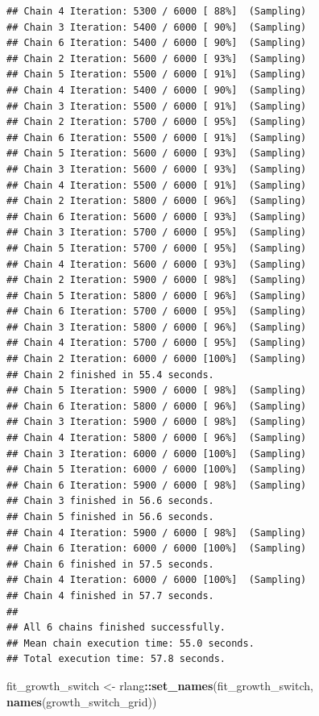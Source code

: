 \documentclass[
]{article}
\newenvironment{Shaded}{\begin{snugshade}}{\end{snugshade}}
\newcommand{\FunctionTok}[1]{\textcolor[rgb]{0.13,0.29,0.53}{\textbf{#1}}}
\newcommand{\NormalTok}[1]{#1}
\newcommand{\OtherTok}[1]{\textcolor[rgb]{0.56,0.35,0.01}{#1}}
\newcommand{\SpecialCharTok}[1]{\textcolor[rgb]{0.81,0.36,0.00}{\textbf{#1}}}
\begin{document}
\begin{verbatim}
## Chain 4 Iteration: 5300 / 6000 [ 88%]  (Sampling) 
## Chain 3 Iteration: 5400 / 6000 [ 90%]  (Sampling) 
## Chain 6 Iteration: 5400 / 6000 [ 90%]  (Sampling) 
## Chain 2 Iteration: 5600 / 6000 [ 93%]  (Sampling) 
## Chain 5 Iteration: 5500 / 6000 [ 91%]  (Sampling) 
## Chain 4 Iteration: 5400 / 6000 [ 90%]  (Sampling) 
## Chain 3 Iteration: 5500 / 6000 [ 91%]  (Sampling) 
## Chain 2 Iteration: 5700 / 6000 [ 95%]  (Sampling) 
## Chain 6 Iteration: 5500 / 6000 [ 91%]  (Sampling) 
## Chain 5 Iteration: 5600 / 6000 [ 93%]  (Sampling) 
## Chain 3 Iteration: 5600 / 6000 [ 93%]  (Sampling) 
## Chain 4 Iteration: 5500 / 6000 [ 91%]  (Sampling) 
## Chain 2 Iteration: 5800 / 6000 [ 96%]  (Sampling) 
## Chain 6 Iteration: 5600 / 6000 [ 93%]  (Sampling) 
## Chain 3 Iteration: 5700 / 6000 [ 95%]  (Sampling) 
## Chain 5 Iteration: 5700 / 6000 [ 95%]  (Sampling) 
## Chain 4 Iteration: 5600 / 6000 [ 93%]  (Sampling) 
## Chain 2 Iteration: 5900 / 6000 [ 98%]  (Sampling) 
## Chain 5 Iteration: 5800 / 6000 [ 96%]  (Sampling) 
## Chain 6 Iteration: 5700 / 6000 [ 95%]  (Sampling) 
## Chain 3 Iteration: 5800 / 6000 [ 96%]  (Sampling) 
## Chain 4 Iteration: 5700 / 6000 [ 95%]  (Sampling) 
## Chain 2 Iteration: 6000 / 6000 [100%]  (Sampling) 
## Chain 2 finished in 55.4 seconds.
## Chain 5 Iteration: 5900 / 6000 [ 98%]  (Sampling) 
## Chain 6 Iteration: 5800 / 6000 [ 96%]  (Sampling) 
## Chain 3 Iteration: 5900 / 6000 [ 98%]  (Sampling) 
## Chain 4 Iteration: 5800 / 6000 [ 96%]  (Sampling) 
## Chain 3 Iteration: 6000 / 6000 [100%]  (Sampling) 
## Chain 5 Iteration: 6000 / 6000 [100%]  (Sampling) 
## Chain 6 Iteration: 5900 / 6000 [ 98%]  (Sampling) 
## Chain 3 finished in 56.6 seconds.
## Chain 5 finished in 56.6 seconds.
## Chain 4 Iteration: 5900 / 6000 [ 98%]  (Sampling) 
## Chain 6 Iteration: 6000 / 6000 [100%]  (Sampling) 
## Chain 6 finished in 57.5 seconds.
## Chain 4 Iteration: 6000 / 6000 [100%]  (Sampling) 
## Chain 4 finished in 57.7 seconds.
## 
## All 6 chains finished successfully.
## Mean chain execution time: 55.0 seconds.
## Total execution time: 57.8 seconds.
\end{verbatim}

\begin{Shaded}
\begin{Highlighting}[]
\NormalTok{fit\_growth\_switch }\OtherTok{\textless{}{-}}\NormalTok{ rlang}\SpecialCharTok{::}\FunctionTok{set\_names}\NormalTok{(fit\_growth\_switch, }\FunctionTok{names}\NormalTok{(growth\_switch\_grid))}
\end{Highlighting}
\end{Shaded}
\end{document}
